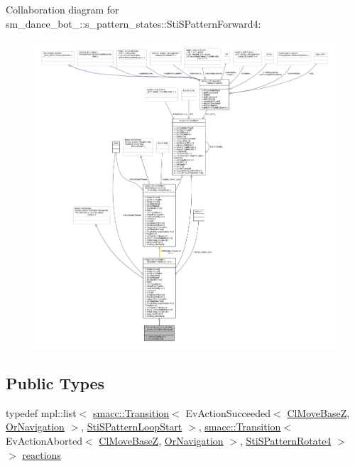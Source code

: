 Collaboration diagram for sm\+\_\+dance\+\_\+bot\+\_\+:\+:s\+\_\+pattern\+\_\+states\+:\+:Sti\+S\+Pattern\+Forward4\+:
\nopagebreak
\begin{figure}[H]
\begin{center}
\leavevmode
\includegraphics[width=350pt]{structsm__dance__bot__3_1_1s__pattern__states_1_1StiSPatternForward4__coll__graph}
\end{center}
\end{figure}
\subsection*{Public Types}
\begin{DoxyCompactItemize}
\item 
typedef mpl\+::list$<$ \hyperlink{classsmacc_1_1Transition}{smacc\+::\+Transition}$<$ Ev\+Action\+Succeeded$<$ \hyperlink{classmove__base__z__client_1_1ClMoveBaseZ}{Cl\+Move\+BaseZ}, \hyperlink{classsm__dance__bot__3_1_1OrNavigation}{Or\+Navigation} $>$, \hyperlink{structsm__dance__bot__3_1_1s__pattern__states_1_1StiSPatternLoopStart}{Sti\+S\+Pattern\+Loop\+Start} $>$, \hyperlink{classsmacc_1_1Transition}{smacc\+::\+Transition}$<$ Ev\+Action\+Aborted$<$ \hyperlink{classmove__base__z__client_1_1ClMoveBaseZ}{Cl\+Move\+BaseZ}, \hyperlink{classsm__dance__bot__3_1_1OrNavigation}{Or\+Navigation} $>$, \hyperlink{structsm__dance__bot__3_1_1s__pattern__states_1_1StiSPatternRotate4}{Sti\+S\+Pattern\+Rotate4} $>$ $>$ \hyperlink{structsm__dance__bot__3_1_1s__pattern__states_1_1StiSPatternForward4_ad3d02c92571c5761e0ace58317bdbb40}{reactions}
\end{DoxyCompactItemize}
